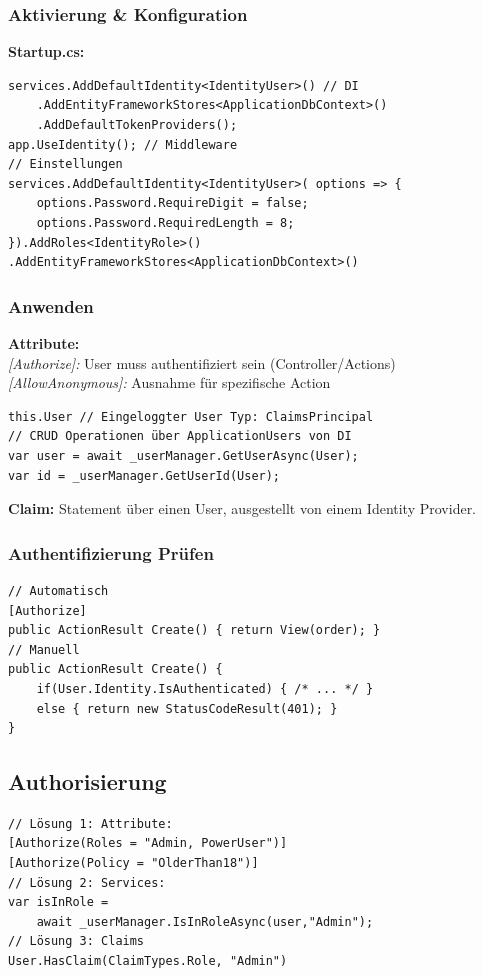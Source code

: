 \subsubsection{Aktivierung \& Konfiguration}
\textbf{Startup.cs:}
\begin{lstlisting}
services.AddDefaultIdentity<IdentityUser>() // DI
    .AddEntityFrameworkStores<ApplicationDbContext>()
    .AddDefaultTokenProviders();
app.UseIdentity(); // Middleware
// Einstellungen
services.AddDefaultIdentity<IdentityUser>( options => {
    options.Password.RequireDigit = false;
    options.Password.RequiredLength = 8;
}).AddRoles<IdentityRole>()
.AddEntityFrameworkStores<ApplicationDbContext>()
\end{lstlisting}

\subsubsection{Anwenden}
\textbf{Attribute:}\\
\textit{[Authorize]:} User muss authentifiziert sein (Controller/Actions)\\
\textit{[AllowAnonymous]:} Ausnahme für spezifische Action
\begin{lstlisting}
this.User // Eingeloggter User Typ: ClaimsPrincipal
// CRUD Operationen über ApplicationUsers von DI
var user = await _userManager.GetUserAsync(User);
var id = _userManager.GetUserId(User);
\end{lstlisting}
\textbf{Claim:} Statement über einen User, ausgestellt von einem Identity Provider.\\

\subsubsection{Authentifizierung Prüfen}
\begin{lstlisting}
// Automatisch
[Authorize]
public ActionResult Create() { return View(order); }
// Manuell
public ActionResult Create() {
    if(User.Identity.IsAuthenticated) { /* ... */ }
    else { return new StatusCodeResult(401); }
}
\end{lstlisting}

\subsection{Authorisierung}
\begin{lstlisting}
// Lösung 1: Attribute:
[Authorize(Roles = "Admin, PowerUser")]
[Authorize(Policy = "OlderThan18")]
// Lösung 2: Services:
var isInRole =
    await _userManager.IsInRoleAsync(user,"Admin");
// Lösung 3: Claims
User.HasClaim(ClaimTypes.Role, "Admin")
\end{lstlisting}

